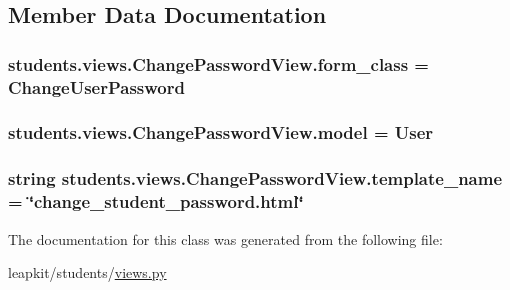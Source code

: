 \subsection{Member Data Documentation}
\hypertarget{classstudents_1_1views_1_1_change_password_view_aa214f4113b8b57922af5caeba0cc0309}{
\subsubsection[{form\-\_\-class}]{\setlength{\rightskip}{0pt plus 5cm}students.\-views.\-Change\-Password\-View.\-form\-\_\-class = Change\-User\-Password\hspace{0.3cm}{\ttfamily [static]}}}\label{classstudents_1_1views_1_1_change_password_view_aa214f4113b8b57922af5caeba0cc0309}
\hypertarget{classstudents_1_1views_1_1_change_password_view_ae00b0734c96a70c9b26cccd21de43835}{
\subsubsection[{model}]{\setlength{\rightskip}{0pt plus 5cm}students.\-views.\-Change\-Password\-View.\-model = User\hspace{0.3cm}{\ttfamily [static]}}}\label{classstudents_1_1views_1_1_change_password_view_ae00b0734c96a70c9b26cccd21de43835}
\hypertarget{classstudents_1_1views_1_1_change_password_view_adf894d4b12b423868347159314d99c8f}{
\subsubsection[{template\-\_\-name}]{\setlength{\rightskip}{0pt plus 5cm}string students.\-views.\-Change\-Password\-View.\-template\-\_\-name = \char`\"{}change\-\_\-student\-\_\-password.\-html\char`\"{}\hspace{0.3cm}{\ttfamily [static]}}}\label{classstudents_1_1views_1_1_change_password_view_adf894d4b12b423868347159314d99c8f}


The documentation for this class was generated from the following file\-:\begin{DoxyCompactItemize}
\item 
leapkit/students/\hyperlink{views_8py}{views.\-py}\end{DoxyCompactItemize}
